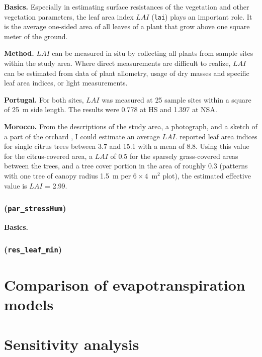 \documentclass{scrreprt}
\begin{document}
\textbf{Basics.}
Especially in estimating surface resistances of the vegetation and other vegetation parameters, the leaf area index $LAI$ (\verb!lai!) plays an important role.
It is the average one-sided area of all leaves of a plant that grow above one square meter of the ground.

\textbf{Method.}
$LAI$ can be measured in situ by collecting all plants from sample sites within the study area.
Where direct measurements are difficult to realize, $LAI$ can be estimated from data of plant allometry, usage of dry masses and specific leaf area indices, or light measurements.

\textbf{Portugal.}
For both sites, $LAI$ was measured at 25 sample sites within a square of 25~m side length.
The results were 0.778 at HS and 1.397 at NSA.

\textbf{Morocco.}
From the descriptions of the study area, a photograph, and a sketch of a part of the orchard \citep{mroos14}, I could estimate an average $LAI$.
\citet{jahn79} reported leaf area indices for single citrus trees between 3.7 and 15.1 with a mean of 8.8.
Using this value for the citrus-covered area, a $LAI$ of 0.5 for the sparsely grass-covered areas between the trees, and a tree cover portion in the area of roughly 0.3 (patterns with one tree of canopy radius 1.5~m per $6 \times 4$~m$^2$ plot), the estimated effective value is $LAI$ = 2.99.

\subsection{(\texttt{par\_stressHum})} \label{ssec:parest_veg_parstresshum}

\textbf{Basics.}

\subsection{(\texttt{res\_leaf\_min})} \label{ssec:parest_veg_resleafmin}


\chapter{Comparison of evapotranspiration models} \label{ch:modelcomp}


\chapter{Sensitivity analysis} \label{ch:sensana}
\end{document}
